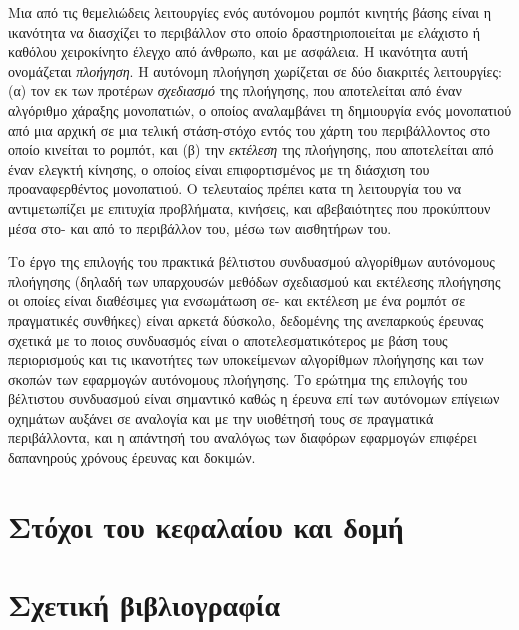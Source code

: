 Μια από τις θεμελιώδεις λειτουργίες ενός αυτόνομου ρομπότ κινητής βάσης είναι η
ικανότητα να διασχίζει το περιβάλλον στο οποίο δραστηριοποιείται με ελάχιστο ή
καθόλου χειροκίνητο έλεγχο από άνθρωπο, και με ασφάλεια. Η ικανότητα αυτή
ονομάζεται \textit{πλοήγηση}. Η αυτόνομη πλοήγηση χωρίζεται σε δύο διακριτές
λειτουργίες: (α) τον εκ των προτέρων \textit{σχεδιασμό} της πλοήγησης, που
αποτελείται από έναν αλγόριθμο χάραξης μονοπατιών, ο οποίος αναλαμβάνει τη
δημιουργία ενός μονοπατιού από μια αρχική σε μια τελική στάση-στόχο εντός του
χάρτη του περιβάλλοντος στο οποίο κινείται το ρομπότ, και (β) την
\textit{εκτέλεση} της πλοήγησης, που αποτελείται από έναν ελεγκτή κίνησης, ο
οποίος είναι επιφορτισμένος με τη διάσχιση του προαναφερθέντος μονοπατιού. Ο
τελευταίος πρέπει κατα τη λειτουργία του να αντιμετωπίζει με επιτυχία
προβλήματα, κινήσεις, και αβεβαιότητες που προκύπτουν μέσα στο- και από το
περιβάλλον του, μέσω των αισθητήρων του.

Το έργο της επιλογής του πρακτικά βέλτιστου συνδυασμού αλγορίθμων αυτόνομους
πλοήγησης (δηλαδή των υπαρχουσών μεθόδων σχεδιασμού και εκτέλεσης πλοήγησης οι
οποίες είναι διαθέσιμες για ενσωμάτωση σε- και εκτέλεση με ένα ρομπότ σε
πραγματικές συνθήκες) είναι αρκετά δύσκολο, δεδομένης της ανεπαρκούς έρευνας
σχετικά με το ποιος συνδυασμός είναι ο αποτελεσματικότερος με βάση τους
περιορισμούς και τις ικανοτήτες των υποκείμενων αλγορίθμων πλοήγησης και των
σκοπών των εφαρμογών αυτόνομους πλοήγησης. Το ερώτημα της επιλογής του
βέλτιστου συνδυασμού είναι σημαντικό καθώς η έρευνα επί των αυτόνομων επίγειων
οχημάτων αυξάνει σε αναλογία και με την υιοθέτησή τους σε πραγματικά
περιβάλλοντα, και η απάντησή του αναλόγως των διαφόρων εφαρμογών επιφέρει
δαπανηρούς χρόνους έρευνας και δοκιμών.

\section{Στόχοι του κεφαλαίου και δομή}
  \label{section:02_01_01}
  

\section{Σχετική βιβλιογραφία}
  \label{section:02_01_02}
  

